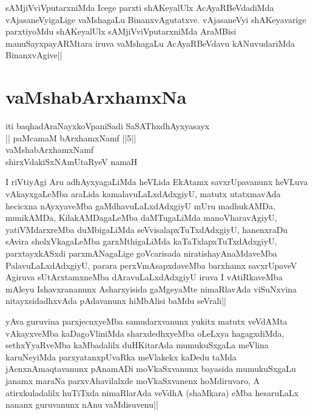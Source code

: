 \begin{artha}
sAMjiVviVputarxniMda Icege parxti shAKeyalUlx AcAyaRBeVdadiMda 
vAjasaneVyigaLige vaMshagaLu BinanxvAgutatxve. vAjasaneVyi 
shAKeyavarige parxtiyoMdu shAKeyalUlx sAMjiVviVputarxniMda 
AraMBisi manuSayxpayARMtara iruva vaMshagaLu AcAyaRBeVdavu 
kANuvudariMda BinanxvAgive||
\end{artha}

\section*{vaMshabArxhamxNa}

\stext

\stext

\stext

\stext

\begin{center}
iti baqhadAraNayxkoVpaniSadi SaSAThxdhAyxyasayx\\
|| paMcamaM bArxhamxNamf ||5||\\
vaMshabArxhamxNamf\\
shirxVdakiSxNAmUtaRyeV namaH
\end{center}


\begin{artha}
I riVtiyAgi Aru adhAyxyagaLiMda heVLida EkAtamx savxrUpavanunx heVLuva 
vAkayxgaLeMba araLida kamalavuLaLxdAdxgiyU, matutx utatxmavAda 
hecicxna nAyxyaveMba gaMdhavuLaLxdAdxgiyU mUru madhukAMDa, munikAMDa, 
KilakAMDagaLeMba daMTugaLiMda manoVharavAgiyU, yatiVMdarxreMba 
duMbigaLiMda seVvisalapxTuTxdAdxgiyU, hanenxraDu sAvira 
sholxVkagaLeMba garxMthigaLiMda kaTaTxlapxTuTxdAdxgiyU, parxtayxkASxdi 
parxmANagaLige goVcarisada niratishayAnaMdaveMba PalavuLaLxdAdxgiyU, 
parara perxVmAsapxdaveMba barxhamx savxrUpaveV Agiruva sUtArxtamxneMba 
dAravuLaLxdAdxgiyU iruva I vAtiRkaveMba mAleyu Ishavxrananunx 
Asharxyisida gaMgeyaMte nimaRlavAda viSuNxvina nitayxsidadhxvAda 
pAdavanunx hiMbAlisi baMdu seVrali||
\end{artha}

\begin{artha}
yAva guruvina parxjecnxyeMba samudarxvanunx yukitx matutx veVdAMta 
vAkayxveMba kaDagoVliniMda sharxdedhxyeMba oLeLxya hagagxdiMda, 
sethxYyaRveMba kaMbadalilx duHKitarAda mumukuSxgaLa meVlina 
karuNeyiMda parxyatanxpUvaRka meVlakekx kaDedu taMda 
jAcnxnAmaqtavanunx pAnamADi moVkaSxvanunx bayasida mumukuSxgaLu janamx 
maraNa parxvAhavilalxde moVkaSxvanenx hoMdiruvaro, A atirxkuladalilx 
huTiTxda nimaRlarAda veVdhA (shaMkara) eMba hesaruLaLx nananx 
guruvanunx nAnu vaMdisuvenu||
\end{artha}

